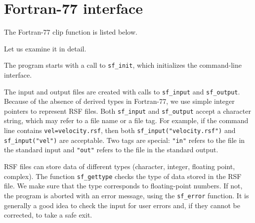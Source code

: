 \section{Fortran-77 interface}

\lstset{language=fortran}
\renewcommand{\rsfclip}{\RSF/api/f77/test/clip.f}

The Fortran-77 clip function is listed below.


Let us examine it in detail.


The program starts with a call to \texttt{sf\_init}, which initializes the
command-line interface.


The input and output files are created with calls to
\texttt{sf\_input} and \texttt{sf\_output}. Because of the absence of
derived types in Fortran-77, we use simple integer pointers to
represent RSF files. Both \texttt{sf\_input} and \texttt{sf\_output}
accept a character string, which may refer to a file name or a file
tag. For example, if the command line contains
\texttt{vel=velocity.rsf}, then both
\texttt{sf\_input("velocity.rsf")} and \texttt{sf\_input("vel")} are
acceptable. Two tags are special: \texttt{"in"} refers to the file in
the standard input and \texttt{"out"} refers to the file in the
standard output.


RSF files can store data of different types (character, integer,
floating point, complex). The function \texttt{sf\_gettype} checks the
type of data stored in the RSF file. We make sure that the type
corresponds to floating-point numbers. If not, the program is aborted
with an error message, using the \texttt{sf\_error} function.  It is
generally a good idea to check the input for user errors and, if they
cannot be corrected, to take a safe exit.

